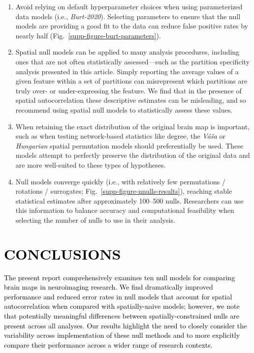 \documentclass[12pt,aps,pra,reprint,showkeys]{revtex4-1}
\newcommand{\nimg}[1]{\textcolor{black}{{#1}}}
\begin{document}
\begin{enumerate}[before=\color{blue}]
    \item Avoid relying on default hyperparameter choices when using parameterized data models (i.e., \textit{Burt-2020}).
    Selecting parameters to ensure that the null models are providing a good fit to the data can reduce false positive rates by nearly half (Fig.~\ref{supp-figure-burt-parameters}).
    \item Spatial null models can be applied to many analysis procedures, including ones that are not often statistically assessed---such as the partition specificity analysis presented in this article.
    Simply reporting the average values of a given feature within a set of partitions can misrepresent which partitions are truly over- or under-expressing the feature.
    We find that in the presence of spatial autocorrelation these descriptive estimates can be misleading, and so recommend using spatial null models to statistically assess these values.
    \item When retaining the exact distribution of the original brain map is important, such as when testing network-based statistics like degree, the \textit{V{\'a}{\v{s}}a} or \textit{Hungarian} spatial permutation models should preferentially be used.
    These models attempt to perfectly preserve the distribution of the original data and are more well-suited to these types of hypotheses.
    \item Null models converge quickly (i.e., with relatively few permutations / rotations / surrogates; Fig.~\ref{supp-figure-nnulls-results}), reaching stable statistical estimates after approximately 100--500 nulls.
    Researchers can use this information to balance accuracy and computational feasibility when selecting the number of nulls to use in their analysis.
\end{enumerate}

\section*{\nimg{CONCLUSIONS}}

\nimg{The present report comprehensively examines ten null models for comparing brain maps in neuroimaging research.
We find dramatically improved performance and reduced error rates in null models that account for spatial autocorrelation when compared with spatially-naive models; however, we note that potentially meaningful differences between spatially-constrained nulls are present across all analyses.
Our results highlight the need to closely consider the variability across implementation of these null methods and to more explicitly compare their performance across a wider range of research contexts.}
\end{document}
